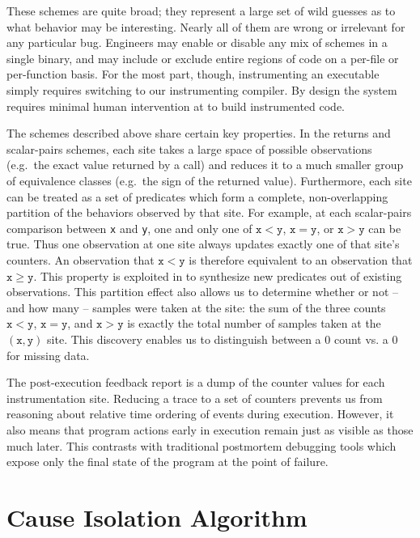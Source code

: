 \documentclass{sig-alternate}
\begin{document}
These schemes are quite broad; they represent a large set of wild
guesses as to what behavior may be interesting.  Nearly all of them
are wrong or irrelevant for any particular bug.  Engineers may enable
or disable any mix of schemes in a single binary, and may include or
exclude entire regions of code on a per-file or per-function basis.
For the most part, though, instrumenting an executable simply requires
switching to our instrumenting compiler.  By design the system
requires minimal human intervention at to build instrumented code.

The schemes described above share certain key properties.  In the
returns and scalar-pairs schemes, each site takes a large space of
possible observations (e.g.\ the exact value returned by a call) and
reduces it to a much smaller group of equivalence classes (e.g.\ the
sign of the returned value).  Furthermore, each site can be treated as
a set of predicates which form a complete, non-overlapping partition
of the behaviors observed by that site.  For example, at each
scalar-pairs comparison between \texttt{x} and \texttt{y}, one and
only one of $\mathtt{x} < \mathtt{y}$, $\mathtt{x} = \mathtt{y}$, or
$\mathtt{x} > \mathtt{y}$ can be true.  Thus one observation at one
site always updates exactly one of that site's counters.  An
observation that $\mathtt{x} < \mathtt{y}$ is therefore equivalent to
an observation that $\mathtt{x} \geq \mathtt{y}$.  This property is
exploited in  to synthesize new predicates out
of existing observations.  This partition effect also allows us to
determine whether or not -- and how many -- samples were taken at the
site: the sum of the three counts $\mathtt{x} < \mathtt{y}$,
$\mathtt{x} = \mathtt{y}$, and $\mathtt{x} > \mathtt{y}$ is exactly
the total number of samples taken at the $\mathtt{(x,y)}$ site.  This
discovery enables us to distinguish between a $0$ count vs. a $0$ for
missing data.

The post-execution feedback report is a dump of the counter values for
each instrumentation site.  Reducing a trace to a set of counters
prevents us from reasoning about relative time ordering of events
during execution.  However, it also means that program actions early
in execution remain just as visible as those much later.  This
contrasts with traditional postmortem debugging tools which expose
only the final state of the program at the point of failure.

\section{Cause Isolation Algorithm}
\label{sec:algorithm}

\end{document}
